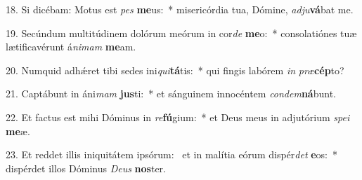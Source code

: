 18. Si dicébam: Motus est \textit{pes} \textbf{me}us:~*  misericórdia tua, Dómine, \textit{ad}\textit{ju}\textbf{vá}bat me.\

19. Secúndum multitúdinem dolórum meórum in cor\textit{de} \textbf{me}o:~*  consolatiónes tuæ lætificavérunt á\textit{ni}\textit{mam} \textbf{me}am.\

20. Numquid adhǽret tibi sedes ini\textit{qui}\textbf{tá}tis:~*  qui fingis labórem \textit{in} \textit{præ}\textbf{cép}to?\

21. Captábunt in áni\textit{mam} \textbf{jus}ti:~*  et sánguinem innocéntem \textit{con}\textit{dem}\textbf{ná}bunt.\

22. Et factus est mihi Dóminus in \textit{re}\textbf{fú}gium:~*  et Deus meus in adjutórium \textit{spe}\textit{i} \textbf{me}æ.\

23. Et reddet illis iniquitátem ipsórum: \dag\  et in malítia eórum dispér\textit{det} \textbf{e}os:~*  dispérdet illos Dóminus \textit{De}\textit{us} \textbf{nos}ter.\

